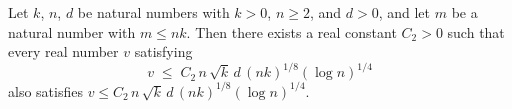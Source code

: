 \begin{theorem}
\label{three_xor_refutation}
\leanok
{}
Let $k$, $n$, $d$ be natural numbers with $k > 0$, $n \ge 2$, and $d > 0$, and let $m$
be a natural number with $m \le nk$. Then there exists a real constant $C_2 > 0$ such
that every real number $v$ satisfying
\[
  v \;\le\; C_2 \, n \, \sqrt{k} \, d \, (nk)^{1/8} (\log n)^{1/4}
\]
also satisfies $v \le C_2 \, n \, \sqrt{k} \, d \, (nk)^{1/8} (\log n)^{1/4}$.
\end{theorem}
